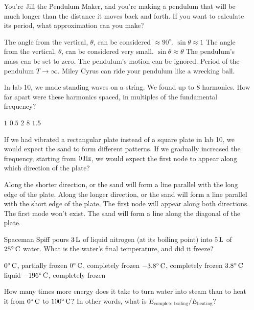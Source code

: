 \documentclass[answers]{exam}
\newcommand{\degree}{^\circ}
\begin{document}
\begin{questions}
\question You're Jill the Pendulum Maker, and you're making a pendulum that will be much longer than the distance it moves back and forth. If you want to calculate its period, what approximation can you make?
\begin{choices}
\choice The angle from the vertical, $\theta$, can be considered $\approx 90\degree$. $\sin{\theta} \approx 1$
\CorrectChoice The angle from the vertical, $\theta$, can be considered very small. $\sin{\theta} \approx \theta$ 
\choice The pendulum's mass can be set to zero.
\choice The pendulum's motion can be ignored. Period of the pendulum $T \rightarrow \infty$.
\choice Miley Cyrus can ride your pendulum like a wrecking ball.
\end{choices}

\question In lab 10, we made standing waves on a string. We found up to $8$ harmonics. How far apart were these harmonics spaced, in multiples of the fundamental frequency?
\begin{choices}
\CorrectChoice $1$ 
\choice $0.5$
\choice $2$
\choice $8$
\choice $1.5$
\end{choices}

\question If we had vibrated a rectangular plate instead of a square plate in lab 10, we would expect the sand to form different patterns. If we gradually increased the frequency, starting from $\unit[0]{Hz}$, we would expect the first node to appear along which direction of the plate?
\begin{choices}
\choice Along the shorter direction, or the sand will form a line parallel with the long edge of the plate.
\CorrectChoice Along the longer direction, or the sand will form a line parallel with the short edge of the plate.
\choice The first node will appear along both directions.
\choice The first mode won't exist.
\choice The sand will form a line along the diagonal of the plate.
\end{choices}



\question Spaceman Spiff pours $\unit[3]{L}$ of liquid nitrogen (at its boiling point) into $\unit[5]{L}$ of $\unit[25\degree]{C}$ water. What is the water's final temperature, and did it freeze?
\begin{choices}
\CorrectChoice $\unit[0\degree]{C}$, partially frozen 
\choice $\unit[0\degree]{C}$, completely frozen
\choice $\unit[-3.8\degree]{C}$, completely frozen
\choice $\unit[3.8\degree]{C}$ liquid
\choice $\unit[-196\degree]{C}$, completely frozen
\end{choices}

\question How many times more energy does it take to turn water into steam than to heat it from $\unit[0\degree]{C}$ to $\unit[100\degree]{C}$? In other words, what is $E_\textrm{complete boiling}/E_\textrm{heating}$?
\begin{choices}
\end{choices}

\end{questions}
\end{document}
